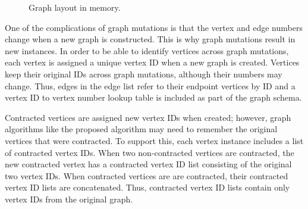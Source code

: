 \begin{figure}[H]
  \centering
  \caption{Graph layout in memory.}
  \label{fig:layout}
\end{figure}

One of the complications of graph mutations is that the vertex and edge numbers change when a new graph is
constructed.  This is why graph mutations result in new instances.  In order to be able to identify vertices across
graph mutations, each vertex is assigned a unique vertex ID when a new graph is created.  Vertices keep their
original IDs across graph mutations, although their numbers may change.  Thus, edges in the edge list refer to
their endpoint vertices by ID and a vertex ID to vertex number lookup table is included as part of the graph
schema.

Contracted vertices are assigned new vertex IDs when created; however, graph algorithms like the proposed algorithm
may need to remember the original vertices that were contracted.  To support this, each vertex instance includes a
list of contracted vertex IDs.  When two non-contracted vertices are contracted, the new contracted vertex has a
contracted vertex ID list consisting of the original two vertex IDs.  When contracted vertices are are contracted,
their contracted vertex ID lists are concatenated.  Thus, contracted vertex ID lists contain only vertex IDs from
the original graph.

